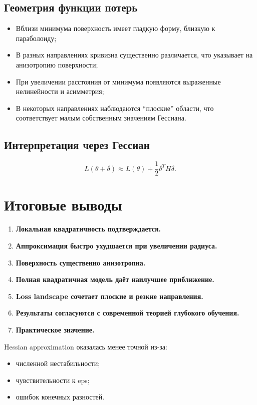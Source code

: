 \documentclass[12pt,a4paper]{article}
\begin{document}
\subsection{Геометрия функции потерь}
\begin{itemize}
    \item Вблизи минимума поверхность имеет гладкую форму, близкую к параболоиду;
    \item В разных направлениях кривизна существенно различается, что указывает на анизотропию поверхности;
    \item При увеличении расстояния от минимума появляются выраженные нелинейности и асимметрия;
    \item В некоторых направлениях наблюдаются ``плоские'' области, что соответствует малым собственным значениям Гессиана.
\end{itemize}

\subsection{Интерпретация через Гессиан}
\[
    L(\theta + \delta)
    \approx
    L(\theta)
    +
    \frac{1}{2}
    \delta^T H \delta.
\]

\section{Итоговые выводы}
\begin{enumerate}
\item \textbf{Локальная квадратичность подтверждается.}
\item \textbf{Аппроксимация быстро ухудшается при увеличении радиуса.}
\item \textbf{Поверхность существенно анизотропна.}
\item \textbf{Полная квадратичная модель даёт наилучшее приближение.}
\item \textbf{Loss landscape сочетает плоские и резкие направления.}
\item \textbf{Результаты согласуются с современной теорией глубокого обучения.}
\item \textbf{Практическое значение.}
\end{enumerate}

Hessian approximation оказалась менее точной из-за:
\begin{itemize}
    \item численной нестабильности;
    \item чувствительности к eps;
    \item ошибок конечных разностей.
\end{itemize}
\end{document}
